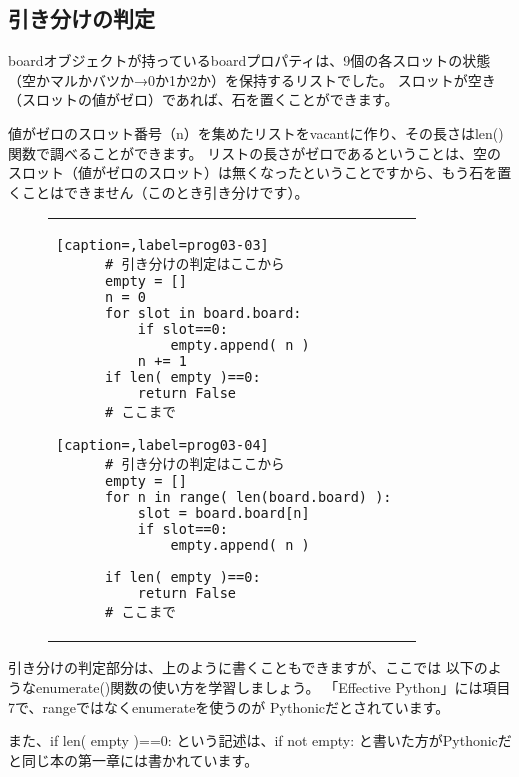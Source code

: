 \documentclass[uplatex,a4paper,11pt,oneside,openany]{jsbook}
\begin{document}
\subsection{引き分けの判定}

boardオブジェクトが持っているboardプロパティは、9個の各スロットの状態（空かマルかバツか→0か1か2か）を保持するリストでした。
スロットが空き（スロットの値がゼロ）であれば、石を置くことができます。

値がゼロのスロット番号（n）を集めたリストをvacantに作り、その長さはlen()関数で調べることができます。
リストの長さがゼロであるということは、空のスロット（値がゼロのスロット）は無くなったということですから、もう石を置くことはできません（このとき引き分けです）。

\begin{figure}[H]
  \centering
  \begin{tabular}{ll}
      \begin{minipage}{0.5\hsize}
      \centering
      \begin{lstlisting}[caption=,label=prog03-03]
      # 引き分けの判定はここから
      empty = []
      n = 0
      for slot in board.board:
          if slot==0:
              empty.append( n )
          n += 1
      if len( empty )==0:
          return False
      # ここまで
      \end{lstlisting}%
      \end{minipage}
      \begin{minipage}{0.5\hsize}
      \flushright
      \begin{lstlisting}[caption=,label=prog03-04]
      # 引き分けの判定はここから
      empty = []
      for n in range( len(board.board) ):
          slot = board.board[n]
          if slot==0:
              empty.append( n )

      if len( empty )==0:
          return False
      # ここまで
      \end{lstlisting}%
      \end{minipage}
    \end{tabular}
\end{figure}%

引き分けの判定部分は、上のように書くこともできますが、ここでは
以下のようなenumerate()関数の使い方を学習しましょう。
「Effective Python」には項目7で、rangeではなくenumerateを使うのが
Pythonicだとされています。

また、if len( empty )==0: という記述は、if not empty: と書いた方がPythonicだと同じ本の第一章には書かれています。
\end{document}
